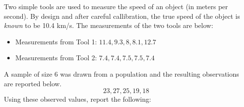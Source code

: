 \documentclass[addpoints]{examsetup}\usepackage[]{graphicx}\usepackage[]{color}
\begin{document}



\examCoverPage

\begin{questions}

\question



Two simple tools are used to measure the speed of an object (in meters per second). 
By design and after careful callibration, the true speed of the object is \textit{known} to be 10.4 km/s.
The measurements of the two tools are below: 

\begin{itemize}

   \item Measurements from Tool 1: $ 11.4, 9.3, 8, 8.1, 12.7 $ \\

   \item Measurements from Tool 2: $ 7.4, 7.4, 7.5, 7.5, 7.4 $ \\

\end{itemize}



\vspace{1cm}

\question 

A sample of size 6 was drawn from a population and the resulting observations are reported below. 
$$
   23, 27, 25, 19, 18
$$
Using these observed values, report the following:

\vspace{1cm}


\end{questions}
\end{document}
